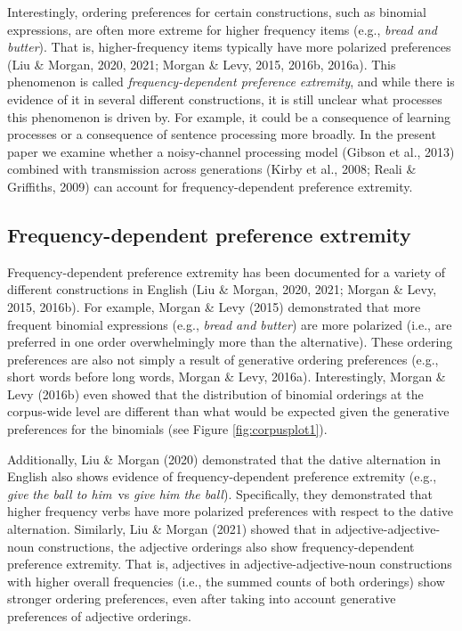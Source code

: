 \documentclass[10pt, letterpaper, hidelinks]{article}
\begin{document}
Interestingly, ordering preferences for certain constructions, such as
binomial expressions, are often more extreme for higher frequency items
(e.g., \emph{bread and butter}). That is, higher-frequency items
typically have more polarized preferences (Liu \& Morgan, 2020, 2021;
Morgan \& Levy, 2015, 2016b, 2016a). This phenomenon is called
\emph{frequency-dependent preference extremity}, and while there is
evidence of it in several different constructions, it is still unclear
what processes this phenomenon is driven by. For example, it could be a
consequence of learning processes or a consequence of sentence
processing more broadly. In the present paper we examine whether a
noisy-channel processing model (Gibson et al., 2013) combined with
transmission across generations (Kirby et al., 2008; Reali \& Griffiths,
2009) can account for frequency-dependent preference extremity.

\hypertarget{frequency-dependent-preference-extremity}{%
\subsection{Frequency-dependent preference
extremity}\label{frequency-dependent-preference-extremity}}

Frequency-dependent preference extremity has been documented for a
variety of different constructions in English (Liu \& Morgan, 2020,
2021; Morgan \& Levy, 2015, 2016b). For example, Morgan \& Levy (2015)
demonstrated that more frequent binomial expressions (e.g., \emph{bread
and butter}) are more polarized (i.e., are preferred in one order
overwhelmingly more than the alternative). These ordering preferences
are also not simply a result of generative ordering preferences (e.g.,
short words before long words, Morgan \& Levy, 2016a). Interestingly,
Morgan \& Levy (2016b) even showed that the distribution of binomial
orderings at the corpus-wide level are different than what would be
expected given the generative preferences for the binomials (see Figure
\ref{fig:corpusplot1}).

Additionally, Liu \& Morgan (2020) demonstrated that the dative
alternation in English also shows evidence of frequency-dependent
preference extremity (e.g., \emph{give} \emph{the ball to him}~vs
\emph{give him the ball}). Specifically, they demonstrated that higher
frequency verbs have more polarized preferences with respect to the
dative alternation. Similarly, Liu \& Morgan (2021) showed that in
adjective-adjective-noun constructions, the adjective orderings also
show frequency-dependent preference extremity. That is, adjectives in
adjective-adjective-noun constructions with higher overall frequencies
(i.e., the summed counts of both orderings) show stronger ordering
preferences, even after taking into account generative preferences of
adjective orderings.
\end{document}
